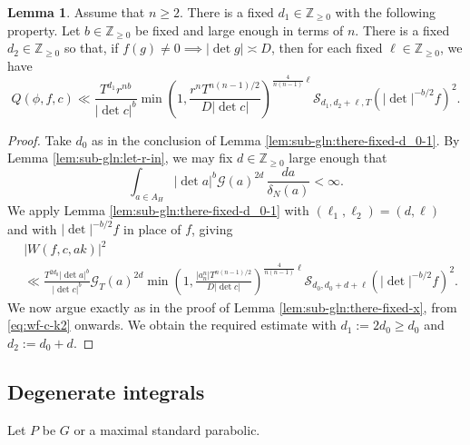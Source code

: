 \documentclass[reqno]{amsart}
\theoremstyle{plain} \newtheorem{theorem} {Theorem}
\theoremstyle{definition} \newtheorem{definition} [theorem] {Definition}
\theoremstyle{itplain} %
\newtheorem{lemma}[theorem]{Lemma}
\numberwithin{equation}{section}
\numberwithin{theorem}{section}
\renewcommand{\geq}{\geqslant}
\begin{document}
\begin{lemma}\label{lem:standard:there-fixed-d_1}
  Assume that $n \geq 2$.
  There is a fixed $d_1 \in \mathbb{Z}_{\geq 0}$ with the following property.  Let $b \in \mathbb{Z}_{\geq 0}$ be fixed and large enough in terms of $n$.  There is a fixed $d_2 \in \mathbb{Z}_{\geq 0}$ so that, if $f(g) \neq 0 \implies |\det g| \asymp D$, then for each fixed $\ell \in \mathbb{Z}_{\geq 0}$, we have
  \begin{equation*}
    Q(\phi,f,c) \ll 
    \frac{T^{d_1} r^{n b}}{|\det c|^b}
    \min \left( 1,
      \frac{r^n T^{n(n-1)/2}}{D |\det c|}
    \right)^{\frac{4}{n(n-1)} \ell }
    \mathcal{S}_{d_1, d_2 + \ell, T}(|\det|^{-b/2} f)^2.
  \end{equation*}
\end{lemma}
\begin{proof}
  Take $d_0$ as in the conclusion of Lemma \ref{lem:sub-gln:there-fixed-d_0-1}.  By Lemma \ref{lem:sub-gln:let-r-in}, we may fix $d \in \mathbb{Z}_{\geq 0}$ large enough that
  \begin{equation*}
    \int _{a \in A_H} |\det a|^b \mathcal{G}(a)^{2 d} \, \frac{d a}{ \delta_N(a)} < \infty.
  \end{equation*}
  We apply Lemma \ref{lem:sub-gln:there-fixed-d_0-1} with $(\ell_1, \ell_2) = (d,\ell)$ and with $|\det|^{-b/2} f$ in place of $f$, giving
  \begin{align*}
    &|W(f,c,a k)|^2 \\
    &\ll
    \frac{ T^{2 d_0} |\det a|^b}{|\det c|^b}
    \mathcal{G}_T(a)^{2 d}
  \min \left( 1,
    \frac{|a_n^n| T^{n(n-1)/2}}{D |\det c|}
  \right)^{\frac{4}{n(n-1)} \ell }
  \mathcal{S}_{d_0, d_0 + d + \ell}(|\det |^{-b/2} f)^2.
  \end{align*}
  We now argue exactly as in the proof of Lemma \ref{lem:sub-gln:there-fixed-x}, from \eqref{eq:wf-c-k2} onwards.  We obtain the required estimate with $d_1 := 2 d_0 \geq d_0$ and $d_2 := d_0 + d$.
\end{proof}

\subsection{Degenerate integrals}\label{sec:degenerate-integrals}
Let $P$ be $G$ or a maximal standard parabolic.
\end{document}
